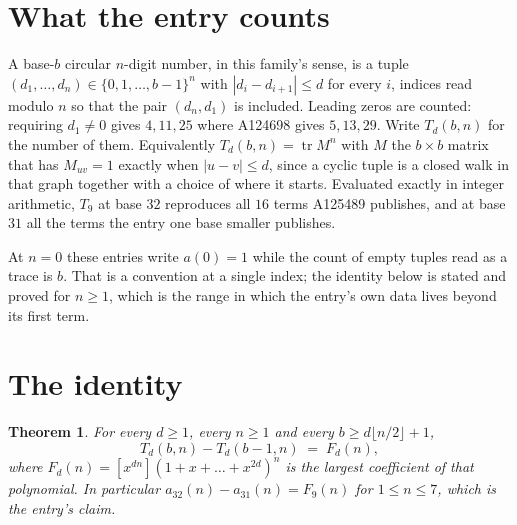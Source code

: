 \documentclass[11pt,a4paper]{article}
\theoremstyle{plain}
\newtheorem{theorem}{Theorem}
\theoremstyle{definition}
\begin{document}
\section{What the entry counts}

A base-$b$ circular $n$-digit number, in this family's sense, is a tuple
$(d_1,\dots,d_n)\in\{0,1,\dots,b-1\}^{n}$ with $|d_i-d_{i+1}|\le d$ for every $i$, indices
read modulo $n$ so that the pair $(d_n,d_1)$ is included. Leading zeros are counted: requiring
$d_1\ne0$ gives $4,11,25$ where A124698 gives $5,13,29$. Write $T_d(b,n)$ for the number of
them. Equivalently $T_d(b,n)=\operatorname{tr}M^{n}$ with $M$ the $b\times b$ matrix that has
$M_{uv}=1$ exactly when $|u-v|\le d$, since a cyclic tuple is a closed walk in that graph
together with a choice of where it starts. Evaluated exactly in integer arithmetic, $T_{9}$
at base $32$ reproduces all $16$ terms A125489 publishes, and at base $31$ all the
terms the entry one base smaller publishes.

At $n=0$ these entries write $a(0)=1$ while the count of empty tuples read as a trace is $b$.
That is a convention at a single index; the identity below is stated and proved for $n\ge1$,
which is the range in which the entry's own data lives beyond its first term.

\section{The identity}

\begin{theorem}
For every $d\ge1$, every $n\ge1$ and every $b\ge d\lfloor n/2\rfloor+1$,
\[
T_d(b,n)-T_d(b-1,n)\;=\;F_d(n),
\]
where $F_d(n)=[x^{dn}](1+x+\dots+x^{2d})^{n}$ is the largest coefficient of that
polynomial. In particular $a_{32}(n)-a_{31}(n)=F_{9}(n)$ for $1\le n\le7$, which
is the entry's claim.
\end{theorem}
\end{document}
